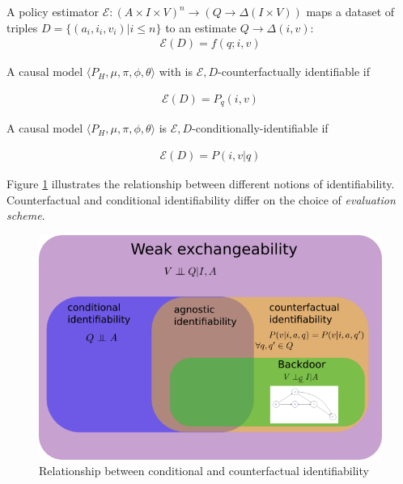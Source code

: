 \begin{definition}
A policy estimator $\mathscr{E}:(A\times I \times V)^n\to (Q\to \Delta(I\times V))$ maps a dataset of triples $D=\{(a_i,i_i,v_i)|i\leq n\}$ to an estimate $Q\to \Delta(i,v)$:
\begin{align}
    \mathscr{E}(D) = f(q;i,v)
\end{align}
\end{definition}

\begin{definition}
A causal model $\langle P_H, \mu,\pi,\phi,\theta\rangle$ with is $\mathscr{E},D$-counterfactually identifiable if 

\begin{align}
    \mathscr{E}(D)=P_q(i,v)
\end{align}
\end{definition}


\begin{definition}
A causal model $\langle P_H, \mu,\pi,\phi,\theta\rangle$ is $\mathscr{E},D$-conditionally-identifiable if 

\begin{align}
    \mathscr{E}(D)=P(i,v|q)
\end{align}
\end{definition}

Figure \ref{fig:venn_diagram} illustrates the relationship between different notions of identifiability. Counterfactual and conditional identifiability differ on the choice of \emph{evaluation scheme}.

\begin{figure}
    \centering
    \includegraphics{venn_diagram.png}
    \caption{Relationship between conditional and counterfactual identifiability}
    \label{fig:venn_diagram}
\end{figure}

